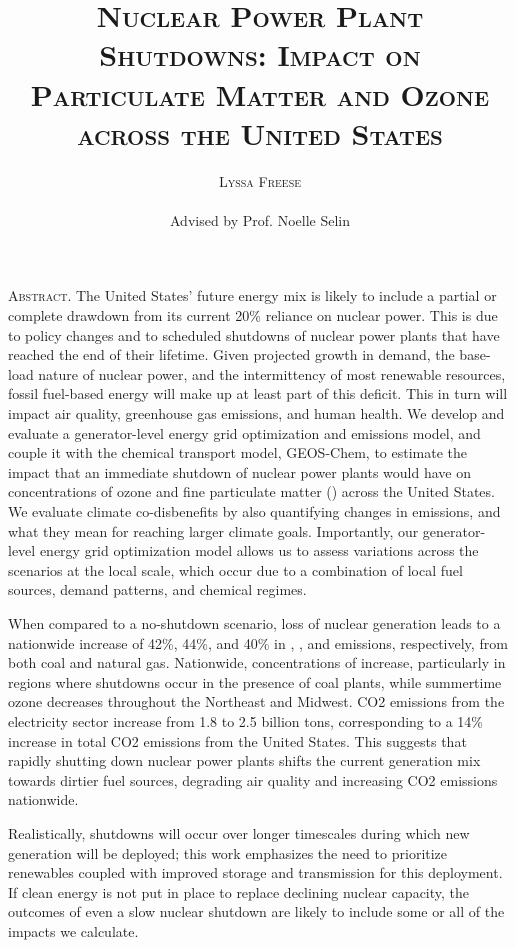 \documentclass[12]{article}
\title{{\textsc{\Large Nuclear Power Plant Shutdowns: Impact on Particulate Matter and Ozone across the United States}}}
\author{\textsc{Lyssa Freese}
\\\\
Advised by Prof. Noelle Selin}
\begin{document}
\maketitle
\thispagestyle{empty}

\setlength{\leftskip}{1.1cm}
\setlength{\rightskip}{1.1cm}


\bigskip
\bigskip

{\textsc{Abstract.} 
The United States’ future energy mix is likely to include a partial or complete drawdown from its current 20\% reliance on nuclear power. This is due to policy changes and to scheduled shutdowns of nuclear power plants that have reached the end of their lifetime. Given projected growth in demand, the base-load nature of nuclear power, and the intermittency of most renewable resources, fossil fuel-based energy will make up at least part of this deficit. This in turn will impact air quality, greenhouse gas emissions, and human health. We develop and evaluate a generator-level energy grid optimization and emissions model, and couple it with the chemical transport model, GEOS-Chem, to estimate the impact that an immediate shutdown of nuclear power plants would have on concentrations of ozone and fine particulate matter () across the United States. We evaluate climate co-disbenefits by also quantifying changes in  emissions, and what they mean for reaching larger climate goals. Importantly, our generator-level energy grid optimization model allows us to assess variations across the scenarios at the local scale, which occur due to a combination of local fuel sources, demand patterns, and chemical regimes.

When compared to a no-shutdown scenario, loss of nuclear generation leads to a nationwide increase of 42\%, 44\%, and 40\% in , , and  emissions, respectively, from both coal and natural gas. Nationwide, concentrations of  increase, particularly in regions where shutdowns occur in the presence of coal plants, while summertime ozone decreases throughout the Northeast and Midwest. CO2 emissions from the electricity sector increase from 1.8 to 2.5 billion tons, corresponding to a 14\% increase in total CO2 emissions from the United States. This suggests that rapidly shutting down nuclear power plants shifts the current generation mix towards dirtier fuel sources, degrading air quality and increasing CO2 emissions nationwide. 

Realistically, shutdowns will occur over longer timescales during which new generation will be deployed; this work emphasizes the need to prioritize renewables coupled with improved storage and transmission for this deployment. If clean energy is not put in place to replace declining nuclear capacity, the outcomes of even a slow nuclear shutdown are likely to include some or all of the impacts we calculate.  
}
\end{document}
